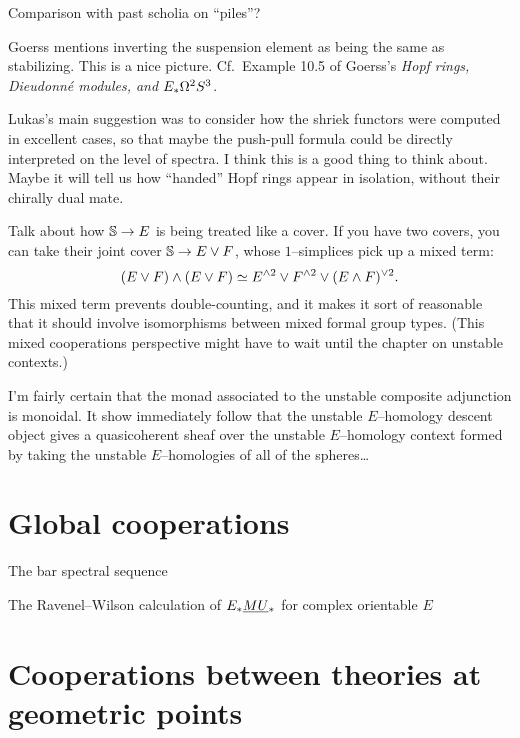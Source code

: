 Comparison with past scholia on ``piles''?


Goerss mentions inverting the suspension element as being the same as stabilizing. This is a nice picture. Cf.\ Example 10.5 of Goerss's \textit{Hopf rings, Dieudonn\'e modules, and $E_* \Loops^2 S^3$}.

Lukas's main suggestion was to consider how the shriek functors were computed in excellent cases, so that maybe the push-pull formula could be directly interpreted on the level of spectra.  I think this is a good thing to think about.  Maybe it will tell us how ``handed'' Hopf rings appear in isolation, without their chirally dual mate.

Talk about how $\S \to E$ is being treated like a cover. If you have two covers, you can take their joint cover $\S \to E \vee F$, whose $1$--simplices pick up a mixed term: \[(E \vee F) \sm (E \vee F) \simeq E^{\sm 2} \vee F^{\sm 2} \vee (E \sm F)^{\vee 2}.\]  This mixed term prevents double-counting, and it makes it sort of reasonable that it should involve isomorphisms between mixed formal group types.  (This mixed cooperations perspective might have to wait until the chapter on unstable contexts.)

I'm fairly certain that the monad associated to the unstable composite adjunction is monoidal.  It show immediately follow that the unstable $E$--homology descent object gives a quasicoherent sheaf over the unstable $E$--homology context formed by taking the unstable $E$--homologies of all of the spheres\ldots







\section{Global cooperations}

The bar spectral sequence

The Ravenel--Wilson calculation of $E_* \OS{MU}{*}$ for complex orientable $E$





\section{Cooperations between theories at geometric points}

